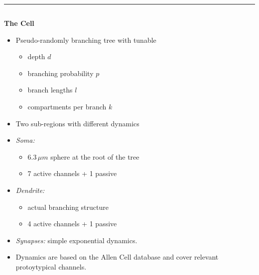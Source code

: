 \documentclass{beamer}
\begin{document}
\begin{frame}[t, fragile]
  \vspace*{1ex}
  \textcolor{arbred}{\rule{\textwidth}{0.5ex}}
  \vspace*{-1ex}
  \begin{columns}[t]
    \begin{column}[T]{0.25\textwidth}
      \textbf{The Cell}
      \begin{itemize}
        \item Pseudo-randomly branching tree with tunable
        \begin{itemize}
          \item depth $d$
          \item branching probability $p$
          \item branch lengths $l$
          \item compartments per branch $k$
        \end{itemize}
        \item Two sub-regions with different dynamics
        \item \emph{Soma:}
        \begin{itemize}
          \item $6.3\,\mu m$ sphere at the root of the tree
          \item 7 active channels + 1 passive
        \end{itemize}
        \item \emph{Dendrite:}
        \begin{itemize}
          \item actual branching structure
          \item 4 active channels + 1 passive
        \end{itemize}
        \item \emph{Synapses:} simple exponential dynamics.
        \item Dynamics are based on the Allen Cell database \cite{allen-v1} and
              cover relevant protoytypical channels.
      \end{itemize}
    \end{column}
    \begin{column}[T]{0.45\textwidth}
      \centering
\end{column}
\end{columns}
\end{frame}
\end{document}
